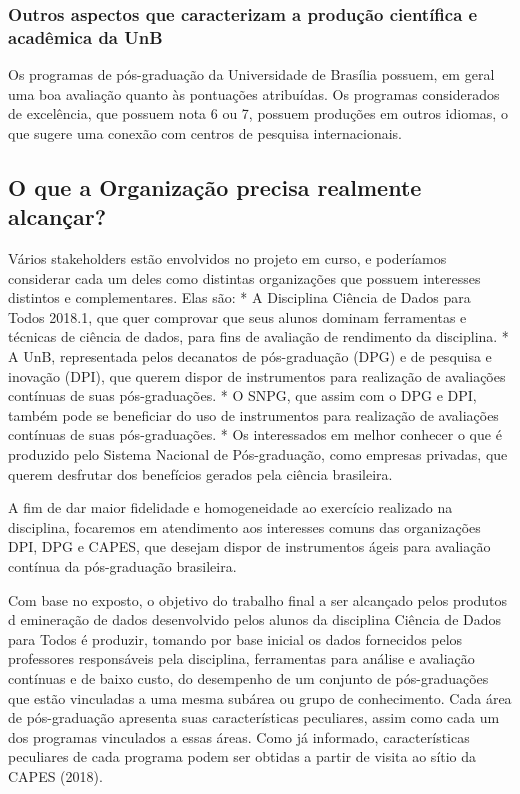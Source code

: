 \documentclass[]{article}
\begin{document}
\subsubsection{Outros aspectos que caracterizam a produção científica e
acadêmica da
UnB}\label{outros-aspectos-que-caracterizam-a-producao-cientifica-e-academica-da-unb}

Os programas de pós-graduação da Universidade de Brasília possuem, em
geral uma boa avaliação quanto às pontuações atribuídas. Os programas
considerados de excelência, que possuem nota 6 ou 7, possuem produções
em outros idiomas, o que sugere uma conexão com centros de pesquisa
internacionais.

\subsection{O que a Organização precisa realmente
alcançar?}\label{o-que-a-organizacao-precisa-realmente-alcancar}

Vários stakeholders estão envolvidos no projeto em curso, e poderíamos
considerar cada um deles como distintas organizações que possuem
interesses distintos e complementares. Elas são: * A Disciplina Ciência
de Dados para Todos 2018.1, que quer comprovar que seus alunos dominam
ferramentas e técnicas de ciência de dados, para fins de avaliação de
rendimento da disciplina. * A UnB, representada pelos decanatos de
pós-graduação (DPG) e de pesquisa e inovação (DPI), que querem dispor de
instrumentos para realização de avaliações contínuas de suas
pós-graduações. * O SNPG, que assim com o DPG e DPI, também pode se
beneficiar do uso de instrumentos para realização de avaliações
contínuas de suas pós-graduações. * Os interessados em melhor conhecer o
que é produzido pelo Sistema Nacional de Pós-graduação, como empresas
privadas, que querem desfrutar dos benefícios gerados pela ciência
brasileira.

A fim de dar maior fidelidade e homogeneidade ao exercício realizado na
disciplina, focaremos em atendimento aos interesses comuns das
organizações DPI, DPG e CAPES, que desejam dispor de instrumentos ágeis
para avaliação contínua da pós-graduação brasileira.

Com base no exposto, o objetivo do trabalho final a ser alcançado pelos
produtos d emineração de dados desenvolvido pelos alunos da disciplina
Ciência de Dados para Todos é produzir, tomando por base inicial os
dados fornecidos pelos professores responsáveis pela disciplina,
ferramentas para análise e avaliação contínuas e de baixo custo, do
desempenho de um conjunto de pós-graduações que estão vinculadas a uma
mesma subárea ou grupo de conhecimento. Cada área de pós-graduação
apresenta suas características peculiares, assim como cada um dos
programas vinculados a essas áreas. Como já informado, características
peculiares de cada programa podem ser obtidas a partir de visita ao
sítio da CAPES (2018).
\end{document}

